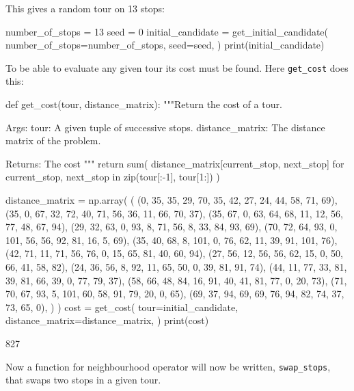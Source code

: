 This gives a random tour on 13 stops:

\begin{pyin}
number_of_stops = 13
seed = 0
initial_candidate = get_initial_candidate(
    number_of_stops=number_of_stops,
    seed=seed,
)
print(initial_candidate)
\end{pyin}

\begin{pyout}
[0, 7, 12, 5, 11, 3, 9, 2, 8, 10, 4, 1, 6, 0]
\end{pyout}

To be able to evaluate any given tour its cost must be found. Here
\texttt{get_cost} does this:

\begin{pyin}
def get_cost(tour, distance_matrix):
    """Return the cost of a tour.

    Args:
        tour: A given tuple of successive stops.
        distance_matrix: The distance matrix of the problem.

    Returns:
        The cost
    """
    return sum(
        distance_matrix[current_stop, next_stop]
        for current_stop, next_stop in zip(tour[:-1], tour[1:])
    )
\end{pyin}

\begin{pyin}
distance_matrix = np.array(
    (
        (0, 35, 35, 29, 70, 35, 42, 27, 24, 44, 58, 71, 69),
        (35, 0, 67, 32, 72, 40, 71, 56, 36, 11, 66, 70, 37),
        (35, 67, 0, 63, 64, 68, 11, 12, 56, 77, 48, 67, 94),
        (29, 32, 63, 0, 93, 8, 71, 56, 8, 33, 84, 93, 69),
        (70, 72, 64, 93, 0, 101, 56, 56, 92, 81, 16, 5, 69),
        (35, 40, 68, 8, 101, 0, 76, 62, 11, 39, 91, 101, 76),
        (42, 71, 11, 71, 56, 76, 0, 15, 65, 81, 40, 60, 94),
        (27, 56, 12, 56, 56, 62, 15, 0, 50, 66, 41, 58, 82),
        (24, 36, 56, 8, 92, 11, 65, 50, 0, 39, 81, 91, 74),
        (44, 11, 77, 33, 81, 39, 81, 66, 39, 0, 77, 79, 37),
        (58, 66, 48, 84, 16, 91, 40, 41, 81, 77, 0, 20, 73),
        (71, 70, 67, 93, 5, 101, 60, 58, 91, 79, 20, 0, 65),
        (69, 37, 94, 69, 69, 76, 94, 82, 74, 37, 73, 65, 0),
    )
)
cost = get_cost(
    tour=initial_candidate,
    distance_matrix=distance_matrix,
)
print(cost)
\end{pyin}

\begin{pyout}
827
\end{pyout}

Now a function for neighbourhood operator will now be written,
\texttt{swap_stops}, that swaps two stops in a given tour.

